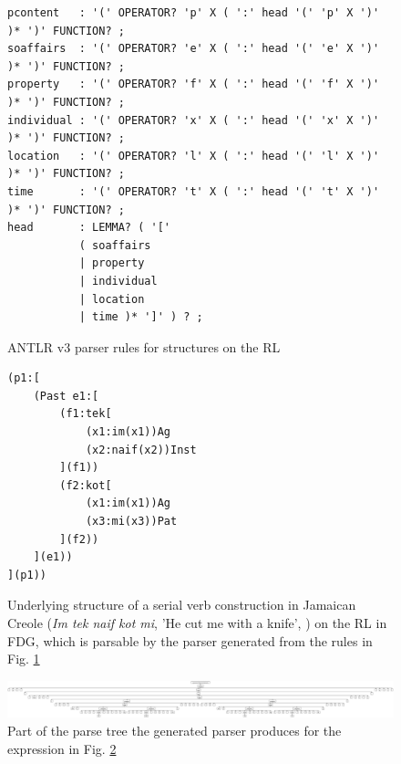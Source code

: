 \documentclass[a4paper, halfparskip, onecolumn, abstractoff, final]{scrartcl}
\begin{document}
\begin{figure}
\begin{verbatim}
pcontent   : '(' OPERATOR? 'p' X ( ':' head '(' 'p' X ')' )* ')' FUNCTION? ;
soaffairs  : '(' OPERATOR? 'e' X ( ':' head '(' 'e' X ')' )* ')' FUNCTION? ;    
property   : '(' OPERATOR? 'f' X ( ':' head '(' 'f' X ')' )* ')' FUNCTION? ;    
individual : '(' OPERATOR? 'x' X ( ':' head '(' 'x' X ')' )* ')' FUNCTION? ;        
location   : '(' OPERATOR? 'l' X ( ':' head '(' 'l' X ')' )* ')' FUNCTION? ;    
time       : '(' OPERATOR? 't' X ( ':' head '(' 't' X ')' )* ')' FUNCTION? ;
head       : LEMMA? ( '[' 
           ( soaffairs 
           | property 
           | individual 
           | location 
           | time )* ']' ) ? ;
\end{verbatim}
\caption{ANTLR v3 parser rules for structures on the RL} \label{antlr-rl-parser}
\end{figure}

\begin{figure}
\begin{center}
\begin{verbatim}
(p1:[ 
    (Past e1:[
        (f1:tek[
            (x1:im(x1))Ag
            (x2:naif(x2))Inst
        ](f1))
        (f2:kot[
            (x1:im(x1))Ag
            (x3:mi(x3))Pat
        ](f2))
    ](e1))
](p1))
\end{verbatim}
\caption{Underlying structure of a serial verb construction in Jamaican Creole (\emph{Im tek naif kot mi}, 'He cut me with a knife', \citealt[290]{Patrick2004}) on the RL in FDG, which is parsable by the parser generated from the rules in Fig. \ref{antlr-rl-parser}}\label{fdg-rl}
\end{center}
\end{figure}

\begin{figure}
\begin{center}
\includegraphics[width=13.5cm]{../tree-part.pdf}
\end{center}
\caption{Part of the parse tree the generated parser produces for the expression in Fig. \ref{fdg-rl}} \label{antlr-tree}
\end{figure}
\end{document}
